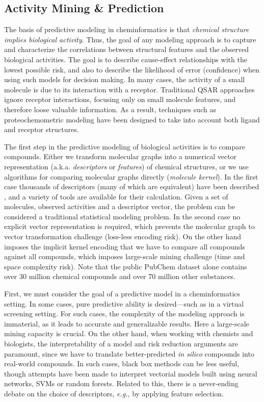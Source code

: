 \documentclass{sig-alternate}
\begin{document}
\subsection{Activity Mining \& Prediction}
\label{sec:activity-mining-}


The basis of predictive modeling in cheminformatics is that \emph{chemical structure
implies biological activity}. Thus, the goal of any modeling approach is to
capture and characterize the correlations between structural features and the
observed biological activities. The goal is to describe cause-effect
relationships with the lowest possible risk, and also to describe the
likelihood of error (confidence) when using such models for decision making. In
many cases, the activity of a small molecule is due to its interaction with a
receptor. Traditional QSAR approaches ignore receptor interactions, focusing
only on small molecule features, and therefore loose valuable information. As a
result, techniques such as proteochemometric modeling have been designed
to take into account both ligand and receptor structures.

The first step in the predictive modeling of biological activities is
to compare compounds. Either we transform molecular graphs into a
numerical vector representation (a.k.a. \emph{descriptors} or
\emph{features}) of chemical structures, or we use algorithms for
comparing molecular graphs directly (\emph{molecule kernel}). In the
first case thousands of descriptors (many of which are equivalent)
have been described \cite{todeschini2000},
and a variety of tools are available for their calculation. Given a
set of molecules, observed activities and a descriptor vector, the
problem can be considered a traditional statistical modeling
problem. In the second case no explicit vector representation is
required, which prevents the molecular graph to vector transformation
challenge (loss-less encoding risk). On the other hand imposes the
implicit kernel encoding that we have to compare all compounds against
all compounds, which imposes large-scale mining challenge (time and
space complexity risk). Note that the public PubChem dataset alone
contains over 30 million chemical compounds and over 70 million other
substances.

First, we must consider the goal of a predictive model in a
cheminformatics setting. In some cases, pure predictive ability is
desired---such as in a virtual screening setting. For such cases, the
complexity of the modeling approach is immaterial, as it leads to
accurate and generalizable results. Here a large-scale mining capacity
is crucial. On the other hand, when working with chemists and
biologists, the interpretability of a model and risk reduction
arguments are paramount, since we have to translate better-predicted
\emph{in silico} compounds into real-world compounds. In such cases,
black box methods can be less useful, though attempts have been made
to interpret vectorial models built using neural networks, SVMs or
random forests. Related to this, there is a never-ending debate on the
choice of descriptors, \emph{e.g.}, by applying feature selection.
\end{document}
